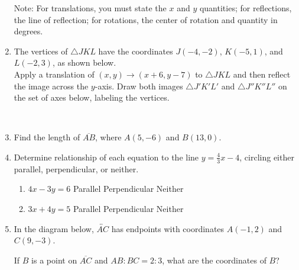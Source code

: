 \begin{enumerate}
Note: For translations, you must state the $x$ and $y$ quantities; for reflections, the line of reflection; for rotations, the center of rotation and quantity in degrees.

\item The vertices of $\triangle JKL$ have the coordinates $J(-4,-2)$, $K(-5,1)$, and $L(-2,3)$, as shown below. \\[0.5cm]
Apply a translation of $(x,y) \rightarrow (x+6, y-7)$ to $\triangle JKL$ and then reflect the image across the $y$-axis. Draw both images $\triangle J'K'L'$ and $\triangle J''K''L''$ on the set of axes below, labeling the vertices.\\
  \\[1.5cm]

\item Find the length of $\overline{AB}$, where $A(5,-6)$ and $B(13,0)$.
    \vspace{4cm}

\item Determine relationship of each equation to the line  $y=\frac{4}{3} x-4$, circling either parallel, perpendicular, or neither.
  \begin{enumerate}
    \item $4x-3y=6$ \hspace{1cm} Parallel \qquad Perpendicular \qquad Neither
    \vspace{1.5cm}
    \item $3x+4y=5$ \hspace{1cm} Parallel \qquad Perpendicular \qquad Neither
    \vspace{2.cm}
  \end{enumerate}

\item In the diagram below, $\overleftrightarrow{AC}$ has endpoints with coordinates $A(-1,2)$ and $C(9, -3)$.
\begin{center} %
\end{center}
If $B$ is a point on $\overline{AC}$ and $AB {:} BC = 2{:}3$,  what  are  the  coordinates of $B$?



\end{enumerate}
